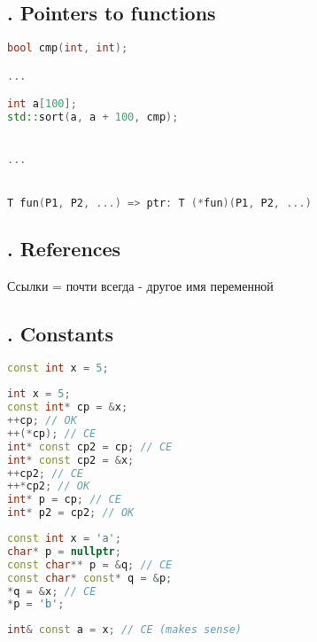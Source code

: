 \documentclass[12pt]{article}
\theoremstyle{definition}
\theoremstyle{definition}
\begin{document}
\subsection{. Pointers to functions}
\lstset{style=mystyle}
\begin{lstlisting}[language=C++, caption=Pointer to function]
bool cmp(int, int);

...

int a[100];
std::sort(a, a + 100, cmp);


...


T fun(P1, P2, ...) => ptr: T (*fun)(P1, P2, ...)
\end{lstlisting}

\subsection{. References}
Ссылки = почти всегда - другое имя переменной

\subsection{. Constants}
\lstset{style=mystyle}
\begin{lstlisting}[language=C++, caption=A constant int]
const int x = 5;
\end{lstlisting}
\lstset{style=mystyle}
\begin{lstlisting}[language=C++, caption=A constant ptr]
int x = 5;
const int* cp = &x;
++cp; // OK
++(*cp); // CE
int* const cp2 = cp; // CE
int* const cp2 = &x;
++cp2; // CE
++*cp2; // OK
int* p = cp; // CE
int* p2 = cp2; // OK
\end{lstlisting}
\lstset{style=mystyle}
\begin{lstlisting}[language=C++, caption=Cool MLG moment]
const int x = 'a';
char* p = nullptr;
const char** p = &q; // CE
const char* const* q = &p;
*q = &x; // CE
*p = 'b';
\end{lstlisting}
\lstset{style=mystyle}
\begin{lstlisting}[language=C++, caption=Logical CE]
int& const a = x; // CE (makes sense)
\end{lstlisting}
\end{document}
